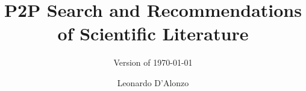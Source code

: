 \documentclass[twoside,a4paper,11pt]{memoir}
\title{P2P Search and Recommendations of Scientific Literature}
\subtitle{Version of \today}
\author{Leonardo D'Alonzo}                               %
\begin{document}
\frontmatter

%


\makefrontespizio
\makeformaltitlepages{}         %



\cleardoublepage\tableofcontents
\cleardoublepage
\mainmatter

















\appendix
\def\chaptername{Appendix}


%
%


%
%
%



%
\end{document}
